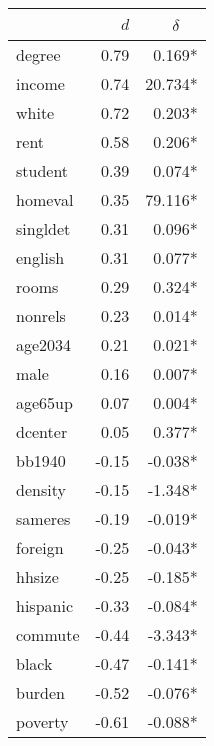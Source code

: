 \begin{tabular}{l r r}
	\toprule
	{}       &   $d$ & $\delta$~~ \\ 
	\midrule
	degree   &  0.79 &     0.169* \\
	income   &  0.74 &    20.734* \\
	white    &  0.72 &     0.203* \\
	rent     &  0.58 &     0.206* \\
	student  &  0.39 &     0.074* \\
	homeval  &  0.35 &    79.116* \\
	singldet &  0.31 &     0.096* \\
	english  &  0.31 &     0.077* \\
	rooms    &  0.29 &     0.324* \\
	nonrels  &  0.23 &     0.014* \\
	age2034  &  0.21 &     0.021* \\
	male     &  0.16 &     0.007* \\
	age65up  &  0.07 &     0.004* \\
	dcenter  &  0.05 &     0.377* \\
	bb1940   & -0.15 &    -0.038* \\
	density  & -0.15 &    -1.348* \\
	sameres  & -0.19 &    -0.019* \\
	foreign  & -0.25 &    -0.043* \\
	hhsize   & -0.25 &    -0.185* \\
	hispanic & -0.33 &    -0.084* \\
	commute  & -0.44 &    -3.343* \\
	black    & -0.47 &    -0.141* \\
	burden   & -0.52 &    -0.076* \\
	poverty  & -0.61 &    -0.088* \\ 
	\bottomrule
\end{tabular}
